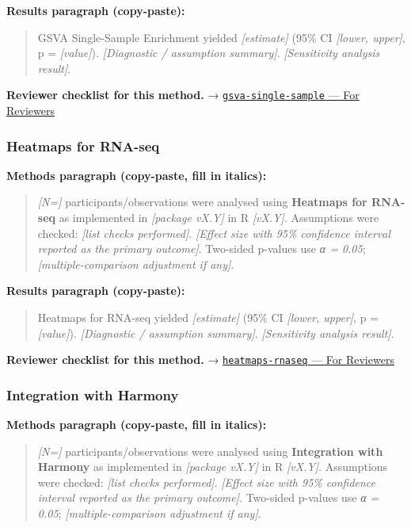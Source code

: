\documentclass[
]{article}
\begin{document}
\textbf{Results paragraph (copy-paste):}

\begin{quote}
GSVA Single-Sample Enrichment yielded \emph{{[}estimate{]}} (95\% CI
\emph{{[}lower, upper{]}}, p = \emph{{[}value{]}}). \emph{{[}Diagnostic
/ assumption summary{]}}. \emph{{[}Sensitivity analysis result{]}}.
\end{quote}

\textbf{Reviewer checklist for this method.} →
\href{../chapters/12-bioinformatics/gsva-single-sample.Rmd\#for-reviewers}{\texttt{gsva-single-sample}
--- For Reviewers}

\subsubsection{Heatmaps for RNA-seq}\label{heatmaps-for-rna-seq}

\textbf{Methods paragraph (copy-paste, fill in italics):}

\begin{quote}
\emph{{[}N={]}} participants/observations were analysed using
\textbf{Heatmaps for RNA-seq} as implemented in \emph{{[}package
vX.Y{]}} in R \emph{{[}vX.Y{]}}. Assumptions were checked: \emph{{[}list
checks performed{]}}. \emph{{[}Effect size with 95\% confidence interval
reported as the primary outcome{]}}. Two-sided p-values use \emph{α =
0.05}; \emph{{[}multiple-comparison adjustment if any{]}}.
\end{quote}

\textbf{Results paragraph (copy-paste):}

\begin{quote}
Heatmaps for RNA-seq yielded \emph{{[}estimate{]}} (95\% CI
\emph{{[}lower, upper{]}}, p = \emph{{[}value{]}}). \emph{{[}Diagnostic
/ assumption summary{]}}. \emph{{[}Sensitivity analysis result{]}}.
\end{quote}

\textbf{Reviewer checklist for this method.} →
\href{../chapters/12-bioinformatics/heatmaps-rnaseq.Rmd\#for-reviewers}{\texttt{heatmaps-rnaseq}
--- For Reviewers}

\subsubsection{Integration with Harmony}\label{integration-with-harmony}

\textbf{Methods paragraph (copy-paste, fill in italics):}

\begin{quote}
\emph{{[}N={]}} participants/observations were analysed using
\textbf{Integration with Harmony} as implemented in \emph{{[}package
vX.Y{]}} in R \emph{{[}vX.Y{]}}. Assumptions were checked: \emph{{[}list
checks performed{]}}. \emph{{[}Effect size with 95\% confidence interval
reported as the primary outcome{]}}. Two-sided p-values use \emph{α =
0.05}; \emph{{[}multiple-comparison adjustment if any{]}}.
\end{quote}
\end{document}
